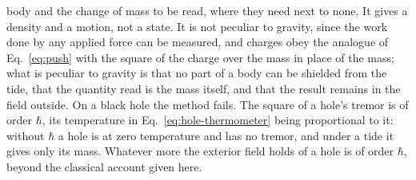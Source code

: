 body and the change of mass to be read, where
they need next to none. It gives a density and a motion, not a state. It is not
peculiar to gravity, since the work done by any applied force can be measured, and
charges obey the analogue of Eq.~\eqref{eq:push} with the square of the charge
over the mass in place of the mass; what is peculiar to gravity is that no part
of a body can be shielded from the tide, that the quantity read is the mass itself, and that the
result remains in the field outside. On a black hole the method
fails. The square of a hole's tremor is of order $\hbar$, its temperature in
Eq.~\eqref{eq:hole-thermometer} being proportional to it: without $\hbar$ a
hole is at zero temperature and has no tremor, and under a tide it gives only its mass. Whatever more the
exterior field holds of a hole is of order $\hbar$, beyond the classical
account given here.


